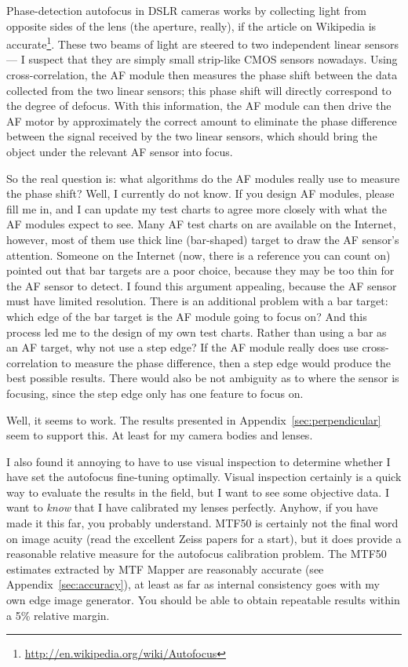 \documentclass[a4paper]{article}
\begin{document}
Phase-detection autofocus in DSLR cameras works by collecting light from
opposite sides of the lens (the aperture, really), if the article on
Wikipedia is
accurate\footnote{\url{http://en.wikipedia.org/wiki/Autofocus}}. These two
beams of light are steered to two independent linear sensors --- I suspect
that they are simply small strip-like CMOS sensors nowadays. Using
cross-correlation, the AF module then measures the phase shift between the
data collected from the two linear sensors; this phase shift will directly
correspond to the degree of defocus. With this information, the AF module
can then drive the AF motor by approximately the correct amount to
eliminate the phase difference between the signal received by the two
linear sensors, which should bring the object under the relevant AF sensor
into focus.

So the real question is: what algorithms do the AF modules really use to
measure the phase shift? Well, I currently do not know. If you design AF
modules, please fill me in, and I can update my test charts to agree more
closely with what the AF modules expect to see. Many AF test charts on are
available on the Internet, however, most of them use thick line (bar-shaped)
target to draw the AF sensor's attention. Someone on the Internet (now,
there is a reference you can count on) pointed out that bar targets are a
poor choice, because they may be too thin for the AF sensor to detect. I
found this argument appealing, because the AF sensor must have limited
resolution. There is an additional problem with a bar target: which edge of
the bar target is the AF module going to focus on? And this process led me
to the design of my own test charts. Rather than using a bar as an AF
target, why not use a step edge? If the AF module really does use
cross-correlation to measure the phase difference, then a step edge would
produce the best possible results. There would also be not ambiguity as to
where the sensor is focusing, since the step edge only has one feature to
focus on.

Well, it seems to work. The results presented in
Appendix~\ref{sec:perpendicular} seem to support this. At least for my
camera bodies and lenses.

I also found it annoying to have to use visual inspection to determine
whether I have set the autofocus fine-tuning optimally. Visual
inspection certainly is a quick way to evaluate the results in the field, but I want to see some
objective data. I want to \emph{know} that I have calibrated my lenses
perfectly. Anyhow, if you have made it this far, you probably understand.
MTF50 is certainly not the final word on image acuity (read the excellent
Zeiss papers for a start), but it does provide a reasonable relative measure
for the autofocus calibration problem. The MTF50 estimates extracted by MTF
Mapper are reasonably accurate (see Appendix~\ref{sec:accuracy}), at least as
far as internal consistency goes with my own edge image generator. You
should be able to obtain repeatable results within a 5\% relative margin.
\end{document}
